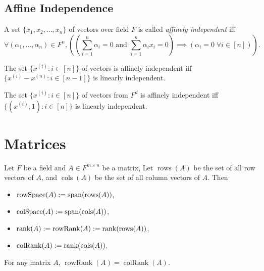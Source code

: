 \documentclass[a4paper,12pt,fleqn]{article}
\newenvironment*{tightemize}{\begin{itemize}[noitemsep]}{\end{itemize}}
\DeclareMathOperator{\Span}{span}
\DeclareMathOperator{\rank}{rank}
\DeclareMathOperator{\rows}{rows}
\DeclareMathOperator{\cols}{cols}
\begin{document}
\subsection{Affine Independence}

\begin{definition}
A set $\{x_1, x_2, \ldots, x_n\}$ of vectors over field $F$
is called \emph{affinely independent} iff
\[ \forall (\alpha_1, \ldots, \alpha_n) \in F^n,
\left( \left(\sum_{i=1}^n \alpha_i = 0 \textrm{ and } \sum_{i=1}^n \alpha_i x_i = 0 \right)
    \implies (\alpha_i = 0 \;\forall i \in [n])\right). \]
\end{definition}

\begin{theorem}
The set $\{x^{(i)}: i \in [n]\}$ of vectors is affinely independent iff
$\{x^{(i)} - x^{(n)}: i \in [n-1]\}$ is linearly independent.
\end{theorem}

\begin{theorem}
The set $\{x^{(i)}: i \in [n]\}$ of vectors from $F^d$ is affinely independent iff
$\{(x^{(i)}, 1): i \in [n]\}$ is linearly independent.
\end{theorem}

\section{Matrices}

\begin{definition}
Let $F$ be a field and $A \in F^{m \times n}$ be a matrix,
Let $\rows(A)$ be the set of all row vectors of $A$,
and $\cols(A)$ be the set of all column vectors of $A$. Then
\begin{tightemize}
\item $\operatorname{rowSpace}(A) \defeq \Span(\rows(A))$,
\item $\operatorname{colSpace}(A) \defeq \Span(\cols(A))$,
\item $\rank(A) \defeq \operatorname{rowRank}(A) \defeq \rank(\rows(A))$,
\item $\operatorname{colRank}(A) \defeq \rank(\cols(A))$.
\end{tightemize}
\end{definition}

\begin{theorem}[DWAP]
For any matrix $A$, $\operatorname{rowRank}(A) = \operatorname{colRank}(A)$.
\end{theorem}
\end{document}
